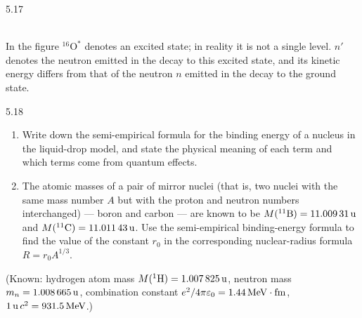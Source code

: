 \begin{figbox}{5.17}
\\[2pt]
{\small In the figure $^{16}\mathrm{O}^*$ denotes an excited state; in reality it is not a single level. $n'$ denotes the neutron emitted in the decay to this excited state, and its kinetic energy differs from that of the neutron $n$ emitted in the decay to the ground state.}
\end{figbox}

\begin{problem}{5.18}
\begin{enumerate}[label=(\arabic*),leftmargin=2.2em,itemsep=1pt,topsep=2pt]
\item Write down the semi-empirical formula for the binding energy of a nucleus in the liquid-drop model, and state the physical meaning of each term and which terms come from quantum effects.
\item The atomic masses of a pair of mirror nuclei (that is, two nuclei with the same mass number $A$ but with the proton and neutron numbers interchanged) --- boron and carbon --- are known to be $M(^{11}\mathrm{B}) = 11.009\,31\,\mathrm{u}$ and $M(^{11}\mathrm{C}) = 11.011\,43\,\mathrm{u}$. Use the semi-empirical binding-energy formula to find the value of the constant $r_0$ in the corresponding nuclear-radius formula $R = r_0A^{1/3}$.
\end{enumerate}
(Known: hydrogen atom mass $M(^{1}\mathrm{H}) = 1.007\,825\,\mathrm{u}$, neutron mass $m_n = 1.008\,665\,\mathrm{u}$, combination constant $e^2/4\pi\varepsilon_0 = 1.44\,\mathrm{MeV\cdot fm}$, $1\,\mathrm{u}\,c^2 = 931.5\,\mathrm{MeV}$.)
\end{problem}

